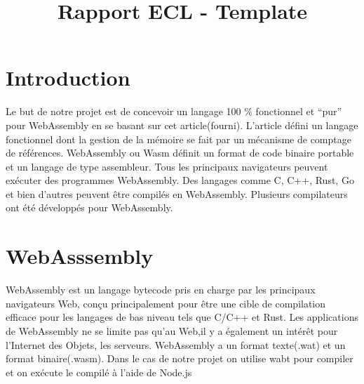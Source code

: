 \documentclass{rapportECL}
\title{Rapport ECL - Template} %
\begin{document}





\fairemarges %
\fairepagedegarde %
\tabledematieres %

\section{Introduction}
Le but de notre projet est de concevoir un langage 100 $\%$ fonctionnel et “pur” pour WebAssembly en 
se basant sur cet article\cite{ullrich_counting_2020}(fourni). L'article défini un langage fonctionnel dont la gestion de la mémoire se fait par 
un mécanisme de comptage de références.
WebAssembly\cite{noauthor_webassembly_nodate} ou Wasm définit un format de code binaire portable
et un langage de type assembleur\cite{noauthor_webassembly_2023}. Tous les principaux navigateurs peuvent exécuter des programmes WebAssembly. 
Des langages comme C, C++, Rust, Go et bien d'autres peuvent être compilés en WebAssembly.
Plusieurs compilateurs ont été développés pour WebAssembly\cite{noauthor_wabt_2023,noauthor_wasm3_2023,noauthor_wasmer_nodate,noauthor_wasmtime_nodate}. 

\section{WebAsssembly}
WebAssembly\cite{noauthor_webassembly_nodate} est un langage bytecode pris en charge par les principaux navigateurs
Web, conçu principalement pour être une cible de compilation efficace pour les langages de bas niveau tels que C/C++ et Rust.
Les applications de WebAssembly ne se limite pas qu'au Web,il y a également un intérêt pour l'Internet des Objets, les serveurs.
WebAssembly a un format texte(.wat) et un format binaire(.wasm). 
Dans le cas de notre projet on utilise wabt\cite{noauthor_wabt_2023} pour compiler et on exécute le compilé à l’aide de Node.js\cite{noauthor_nodejs_nodate}
\end{document}
